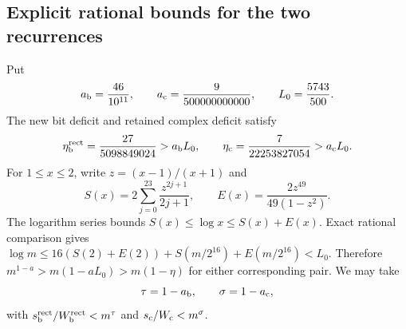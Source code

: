 \subsection{Explicit rational bounds for the two recurrences}
Put
\[
 a_{\rm b}=\frac{46}{10^{11}},\qquad
 a_{\rm c}=\frac9{500000000000},\qquad L_0=\frac{5743}{500}.
\]
The new bit deficit and retained complex deficit satisfy
\[
 \eta_{\rm b}^{\rm rect}=\frac{27}{5098849024}>a_{\rm b}L_0,
 \qquad \eta_{\rm c}=\frac7{22253827054}>a_{\rm c}L_0.
\]
For $1\le x\le2$, write $z=(x-1)/(x+1)$ and
\[
 S(x)=2\sum_{j=0}^{23}\frac{z^{2j+1}}{2j+1},\qquad
 E(x)=\frac{2z^{49}}{49(1-z^2)}.
\]
The logarithm series bounds $S(x)\le\log x\le S(x)+E(x)$.
Exact rational comparison gives
$\log m\le16(S(2)+E(2))+S(m/2^{16})+E(m/2^{16})<L_0$.
Therefore $m^{1-a}>m(1-aL_0)>m(1-\eta)$ for either corresponding pair.
We may take
\begin{equation}\label{eq:explicit-motif-exponents}
 \tau=1-a_{\rm b},\qquad\sigma=1-a_{\rm c},
\end{equation}
with $s_{\rm b}^{\rm rect}/W_{\rm b}^{\rm rect}<m^\tau$ and
$s_{\rm c}/W_{\rm c}<m^\sigma$.
